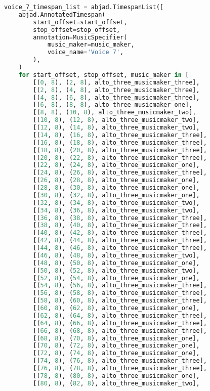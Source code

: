 \begin{lstlisting}[language=Python, caption=Invocation Source Code]
voice_7_timespan_list = abjad.TimespanList([
    abjad.AnnotatedTimespan(
        start_offset=start_offset,
        stop_offset=stop_offset,
        annotation=MusicSpecifier(
            music_maker=music_maker,
            voice_name='Voice 7',
        ),
    )
    for start_offset, stop_offset, music_maker in [
        [(0, 8), (2, 8), alto_three_musicmaker_three],
        [(2, 8), (4, 8), alto_three_musicmaker_three],
        [(4, 8), (6, 8), alto_three_musicmaker_three],
        [(6, 8), (8, 8), alto_three_musicmaker_one],
        [(8, 8), (10, 8), alto_three_musicmaker_two],
        [(10, 8), (12, 8), alto_three_musicmaker_two],
        [(12, 8), (14, 8), alto_three_musicmaker_two],
        [(14, 8), (16, 8), alto_three_musicmaker_three],
        [(16, 8), (18, 8), alto_three_musicmaker_three],
        [(18, 8), (20, 8), alto_three_musicmaker_three],
        [(20, 8), (22, 8), alto_three_musicmaker_three],
        [(22, 8), (24, 8), alto_three_musicmaker_one],
        [(24, 8), (26, 8), alto_three_musicmaker_three],
        [(26, 8), (28, 8), alto_three_musicmaker_one],
        [(28, 8), (30, 8), alto_three_musicmaker_one],
        [(30, 8), (32, 8), alto_three_musicmaker_one],
        [(32, 8), (34, 8), alto_three_musicmaker_two],
        [(34, 8), (36, 8), alto_three_musicmaker_two],
        [(36, 8), (38, 8), alto_three_musicmaker_three],
        [(38, 8), (40, 8), alto_three_musicmaker_three],
        [(40, 8), (42, 8), alto_three_musicmaker_three],
        [(42, 8), (44, 8), alto_three_musicmaker_three],
        [(44, 8), (46, 8), alto_three_musicmaker_three],
        [(46, 8), (48, 8), alto_three_musicmaker_two],
        [(48, 8), (50, 8), alto_three_musicmaker_one],
        [(50, 8), (52, 8), alto_three_musicmaker_two],
        [(52, 8), (54, 8), alto_three_musicmaker_one],
        [(54, 8), (56, 8), alto_three_musicmaker_three],
        [(56, 8), (58, 8), alto_three_musicmaker_three],
        [(58, 8), (60, 8), alto_three_musicmaker_three],
        [(60, 8), (62, 8), alto_three_musicmaker_one],
        [(62, 8), (64, 8), alto_three_musicmaker_three],
        [(64, 8), (66, 8), alto_three_musicmaker_three],
        [(66, 8), (68, 8), alto_three_musicmaker_three],
        [(68, 8), (70, 8), alto_three_musicmaker_one],
        [(70, 8), (72, 8), alto_three_musicmaker_one],
        [(72, 8), (74, 8), alto_three_musicmaker_one],
        [(74, 8), (76, 8), alto_three_musicmaker_three],
        [(76, 8), (78, 8), alto_three_musicmaker_three],
        [(78, 8), (80, 8), alto_three_musicmaker_one],
        [(80, 8), (82, 8), alto_three_musicmaker_two],

\end{lstlisting}
